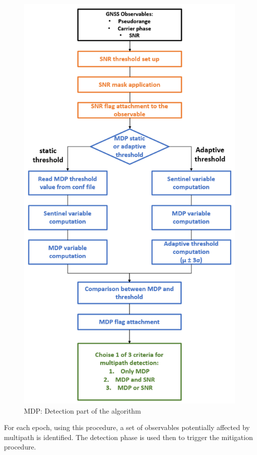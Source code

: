 \begin{figure}[H] 
	\centering
	\includegraphics[scale=1]{fig/mdpscheme.png} 
	\caption{MDP: Detection part of the algorithm}
	\label{FIG:mdp_workflow} 
\end{figure}
\clearpage
For each epoch, using this procedure, a set of observables potentially affected by multipath is identified. 
The detection phase is used then to trigger the mitigation procedure.
